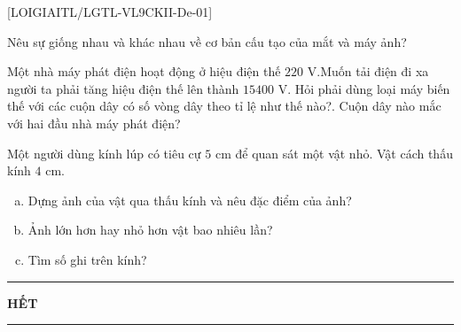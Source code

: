 [LOIGIAITL/LGTL-VL9CKII-De-01]
\hienthiloigiaibt
\begin{bt}[$1{,}5$ điểm]Nêu sự giống nhau và khác nhau về cơ bản cấu tạo của mắt và máy ảnh?
	\loigiai{}
\end{bt}
\begin{bt}[$1{,}0$ điểm]Một nhà máy phát điện hoạt động ở hiệu điện thế $220$ V.Muốn tải điện đi xa người ta phải tăng hiệu điện thế lên thành $15400$ V. Hỏi phải dùng loại máy biến thế với các cuộn dây có số vòng dây theo tỉ lệ như thế nào?. Cuộn dây nào mắc với hai đầu nhà máy phát điện?
	\loigiai{}
\end{bt}
\begin{bt}[$2{,}5$ điểm] Một người dùng kính lúp có tiêu cự $5$ cm để quan sát một vật nhỏ. Vật cách thấu kính $4$ cm.
	\begin{enumerate}[a)]
		\item Dựng ảnh của vật qua thấu kính và nêu đặc điểm của ảnh?
		\item Ảnh lớn hơn hay nhỏ hơn vật bao nhiêu lần?
		\item Tìm số ghi trên kính?
	\end{enumerate}
	\loigiai{}
\end{bt}
\fileend
\begin{center}
	\rule[4pt]{2cm}{1pt}\large \textbf{HẾT}\rule[4pt]{2cm}{1pt}
\end{center}











